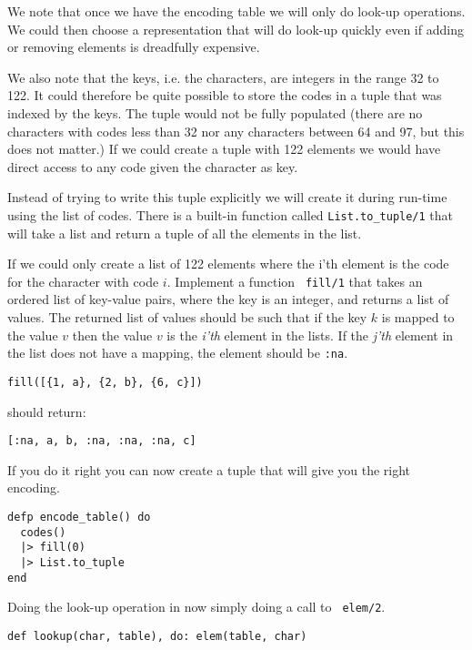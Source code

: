 \documentclass[a4paper,11pt]{article}
\begin{document}
We note that once we have the encoding table we will only do look-up
operations. We could then choose a representation that will do look-up
quickly even if adding or removing elements is dreadfully expensive.

We also note that the keys, i.e. the characters, are integers in the
range 32 to 122. It could therefore be quite possible to store the
codes in a tuple that was indexed by the keys. The tuple would not be
fully populated (there are no characters with codes less than 32 nor
any characters between 64 and 97, but this does not matter.) If we
could create a tuple with 122 elements we would have direct access to
any code given the character as key.

Instead of trying to write this tuple explicitly we will create it
during run-time using the list of codes. There is a built-in function
called {\tt List.to\_tuple/1} that will take a list and return a
tuple of all the elements in the list.

If we could only create a list of 122 elements where the i'th element
is the code for the character with code $i$. Implement a function {\tt
  fill/1} that takes an ordered list of key-value pairs, where the
key is an integer, and returns a list of values. The returned list of
values should be such that if the key $k$ is mapped to the value $v$
then the value $v$ is the {\em i'th} element in the lists. If the {\em
  j'th} element in the list does not have a mapping, the element
should be {\tt :na}.

\begin{verbatim}
fill([{1, a}, {2, b}, {6, c}])
\end{verbatim}

should return:

\begin{verbatim}
[:na, a, b, :na, :na, :na, c]
\end{verbatim}

If you do it right you can now create a tuple that will give you the
right encoding.

\begin{verbatim}
defp encode_table() do
  codes()
  |> fill(0)
  |> List.to_tuple
end
\end{verbatim}

Doing the look-up operation in now simply doing a call to {\tt
  elem/2}.
  
\begin{verbatim}
def lookup(char, table), do: elem(table, char)
\end{verbatim}
\end{document}
